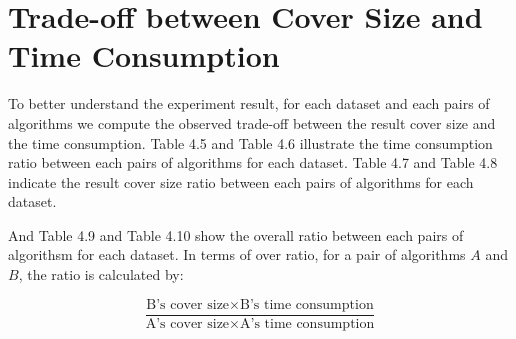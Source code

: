 \documentclass[11pt]{book}
\begin{document}
\section{Trade-off between Cover Size and Time Consumption}

To better understand the experiment result, for each dataset and each pairs of algorithms we compute the observed trade-off between the result cover size and the time consumption. Table 4.5 and Table 4.6 illustrate the time consumption ratio between each pairs of algorithms for each dataset. Table 4.7 and Table 4.8 indicate the result cover size ratio between each pairs of algorithms for each dataset.

And Table 4.9 and Table 4.10 show the overall ratio between each pairs of algorithsm for each dataset. In terms of over ratio, for a pair of algorithms $A$ and $B$, the ratio is calculated by:

$$
\frac
	{\text{B's cover size} \times \text{B's time consumption}}
	{\text{A's cover size} \times \text{A's time consumption}}
$$
\end{document}
